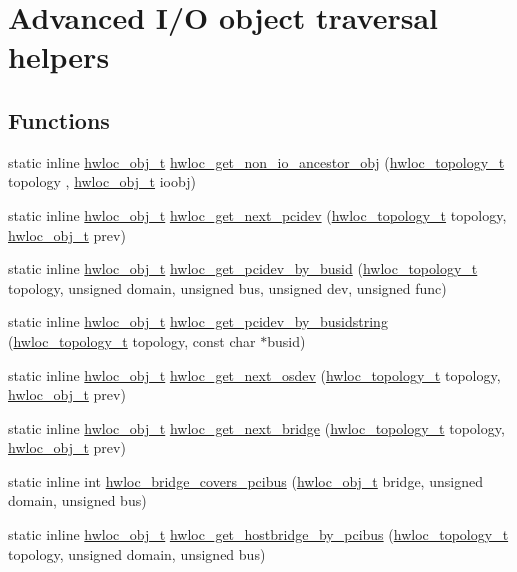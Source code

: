 \hypertarget{a00064}{
\section{Advanced I/O object traversal helpers}
\label{a00064}
}
\subsection*{Functions}
\begin{DoxyCompactItemize}
\item 
static inline \hyperlink{a00016}{hwloc\_\-obj\_\-t} \hyperlink{a00064_ga3603275746a8792e54415d79763aa9e9}{hwloc\_\-get\_\-non\_\-io\_\-ancestor\_\-obj} (\hyperlink{a00039_ga9d1e76ee15a7dee158b786c30b6a6e38}{hwloc\_\-topology\_\-t} topology , \hyperlink{a00016}{hwloc\_\-obj\_\-t} ioobj)
\item 
static inline \hyperlink{a00016}{hwloc\_\-obj\_\-t} \hyperlink{a00064_gad6e1ed122ef3b6e098538d75acd5e3f6}{hwloc\_\-get\_\-next\_\-pcidev} (\hyperlink{a00039_ga9d1e76ee15a7dee158b786c30b6a6e38}{hwloc\_\-topology\_\-t} topology, \hyperlink{a00016}{hwloc\_\-obj\_\-t} prev)
\item 
static inline \hyperlink{a00016}{hwloc\_\-obj\_\-t} \hyperlink{a00064_ga546e1d690c63fb24177f3013ed78ceb1}{hwloc\_\-get\_\-pcidev\_\-by\_\-busid} (\hyperlink{a00039_ga9d1e76ee15a7dee158b786c30b6a6e38}{hwloc\_\-topology\_\-t} topology, unsigned domain, unsigned bus, unsigned dev, unsigned func)
\item 
static inline \hyperlink{a00016}{hwloc\_\-obj\_\-t} \hyperlink{a00064_ga9d5643f2e337fe1b98e7cce5c1ecb74e}{hwloc\_\-get\_\-pcidev\_\-by\_\-busidstring} (\hyperlink{a00039_ga9d1e76ee15a7dee158b786c30b6a6e38}{hwloc\_\-topology\_\-t} topology, const char $\ast$busid)
\item 
static inline \hyperlink{a00016}{hwloc\_\-obj\_\-t} \hyperlink{a00064_ga73a5bc6265642e6001f7a10812ab886d}{hwloc\_\-get\_\-next\_\-osdev} (\hyperlink{a00039_ga9d1e76ee15a7dee158b786c30b6a6e38}{hwloc\_\-topology\_\-t} topology, \hyperlink{a00016}{hwloc\_\-obj\_\-t} prev)
\item 
static inline \hyperlink{a00016}{hwloc\_\-obj\_\-t} \hyperlink{a00064_ga2bd3f856d0fc3c6c02642c17d763b823}{hwloc\_\-get\_\-next\_\-bridge} (\hyperlink{a00039_ga9d1e76ee15a7dee158b786c30b6a6e38}{hwloc\_\-topology\_\-t} topology, \hyperlink{a00016}{hwloc\_\-obj\_\-t} prev)
\item 
static inline int \hyperlink{a00064_gaef22d6bf5cb0b7f13a863780126a8cb7}{hwloc\_\-bridge\_\-covers\_\-pcibus} (\hyperlink{a00016}{hwloc\_\-obj\_\-t} bridge, unsigned domain, unsigned bus)
\item 
static inline \hyperlink{a00016}{hwloc\_\-obj\_\-t} \hyperlink{a00064_ga81d4f68afbd68d94eb70d4f5c603eff5}{hwloc\_\-get\_\-hostbridge\_\-by\_\-pcibus} (\hyperlink{a00039_ga9d1e76ee15a7dee158b786c30b6a6e38}{hwloc\_\-topology\_\-t} topology, unsigned domain, unsigned bus)
\end{DoxyCompactItemize}


